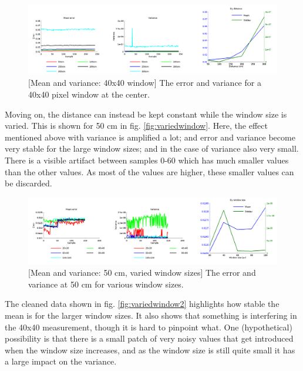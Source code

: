 \documentclass[11pt]{article}
\begin{document}
\begin{figure}[ht]
  \includegraphics[width=1\textwidth]{figures/plot40x40.png}
  [Mean and variance: 40x40 window]{\label{fig:40x40} The
    error and variance for a 40x40 pixel window at the center.}
\end{figure}

Moving on, the distance can instead be kept constant while the window size is
varied. This is shown for 50 cm in fig.  \vref{fig:variedwindow}. Here, the
effect mentioned above with variance is amplified a lot; and error and variance
become very stable for the large window sizes; and in the case of variance also
very small. There is a visible artifact between samples 0-60 which has much
smaller values than the other values. As most of the values are higher, these
smaller values can be discarded. \par


\begin{figure}[ht]
  \centering
  \includegraphics[width=1\textwidth]{figures/plotwindowsizes.png}
  [Mean and variance: 50 cm, varied window
  sizes]{\label{fig:variedwindow} The error and variance at 50 cm for various
    window sizes.}
\end{figure}

The cleaned data shown in fig. \vref{fig:variedwindow2} highlights how stable
the mean is for the larger window sizes. It also shows that something is
interfering in the 40x40 measurement, though it is hard to pinpoint what. One
(hypothetical) possibility is that there is a small patch of very noisy values
that get introduced when the window size increases, and as the window size is
still quite small it has a large impact on the variance. \par
\end{document}
